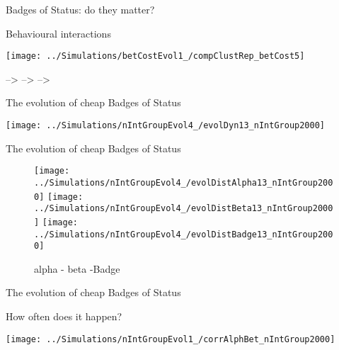 \documentclass[
  ignorenonframetext,
]{beamer}
\begin{document}
\begin{frame}{Badges of Status: do they matter?}
\protect\hypertarget{badges-of-status-do-they-matter}{}

\begin{block}{Behavioural interactions}

\begin{center}\texttt{[image: ../Simulations/betCostEvol1\_/compClustRep\_betCost5]} \end{center}

--\textgreater{} --\textgreater{} --\textgreater{}

\end{block}

\end{frame}

\begin{frame}{The evolution of cheap Badges of Status}
\protect\hypertarget{the-evolution-of-cheap-badges-of-status}{}

\begin{center}\texttt{[image: ../Simulations/nIntGroupEvol4\_/evolDyn13\_nIntGroup2000]} \end{center}

\end{frame}

\begin{frame}{The evolution of cheap Badges of Status}
\protect\hypertarget{the-evolution-of-cheap-badges-of-status-1}{}

\begin{figure}

\texttt{[image: ../Simulations/nIntGroupEvol4\_/evolDistAlpha13\_nIntGroup2000]} \texttt{[image: ../Simulations/nIntGroupEvol4\_/evolDistBeta13\_nIntGroup2000]} \texttt{[image: ../Simulations/nIntGroupEvol4\_/evolDistBadge13\_nIntGroup2000]} \hfill{}

\caption{alpha - beta -Badge}\label{fig:unnamed-chunk-27}
\end{figure}

\end{frame}

\begin{frame}{The evolution of cheap Badges of Status}
\protect\hypertarget{the-evolution-of-cheap-badges-of-status-2}{}

\begin{block}{How often does it happen?}

\begin{flushleft}\texttt{[image: ../Simulations/nIntGroupEvol1\_/corrAlphBet\_nIntGroup2000]} \end{flushleft}

\end{block}

\end{frame}
\end{document}
